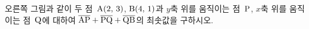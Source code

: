 \noindent\begin{minipage}[t]{0.58\linewidth}\vspace{0pt}\raggedright 오른쪽 그림과 같이 두 점~$\mathrm{A}(2,\mkern3mu 3)$, $\mathrm{B}(4,\mkern3mu 1)$과 $y$축 위를 움직이는 점~$\mathrm{P}$, $x$축 위를 움직이는 점~$\mathrm{Q}$에 대하여 $\overline{\mathrm{AP}}+\overline{\mathrm{PQ}}+\overline{\mathrm{QB}}$의 최솟값을 구하시오.\end{minipage}\hfill\begin{minipage}[t]{0.4\linewidth}\vspace{0pt}\centering \resizebox{\ifdim\width>\linewidth\linewidth\else\width\fi}{!}{}\end{minipage}\par
